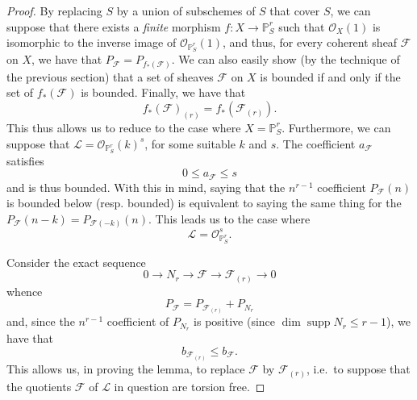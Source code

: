 \documentclass{article}
\newcommand{\oldpage}[1]{\marginpar{\footnotesize$\Big\vert$ \textit{p.~#1}}}
\theoremstyle{definition}
\theoremstyle{definition}
\theoremstyle{definition}
\theoremstyle{definition}
\theoremstyle{remark}
\begin{document}
\begin{proof}
By replacing \(S\) by a union of subschemes of \(S\) that cover \(S\), we can suppose that there exists a \emph{finite} morphism \(f\colon X\to\mathbb{P}_S^r\) such that \({\mathscr{O}}_X(1)\) is isomorphic to the inverse image of \({\mathscr{O}}_{\mathbb{P}_S^r}(1)\), and thus, for every coherent sheaf \({\mathscr{F}}\) on \(X\), we have that \(P_{\mathscr{F}}=P_{f_*({\mathscr{F}})}\).
We can also easily show (by the technique of the previous section) that a set of sheaves \({\mathscr{F}}\) on \(X\) is bounded if and only if the set of \(f_*({\mathscr{F}})\) is bounded.
Finally, we have that
\[
  f_*({\mathscr{F}})_{(r)} = f_*({\mathscr{F}}_{(r)}).
\]
\oldpage{221-08}This thus allows us to reduce to the case where \(X=\mathbb{P}_S^r\).
Furthermore, we can suppose that \({\mathscr{L}}={\mathscr{O}}_{\mathbb{P}_S^r}(k)^s\), for some suitable \(k\) and \(s\).
The coefficient \(a_{\mathscr{F}}\) satisfies
\[
  0\leqslant a_{\mathscr{F}} \leqslant s
\]
and is thus bounded.
With this in mind, saying that the \(n^{r-1}\) coefficient \(P_{\mathscr{F}}(n)\) is bounded below (resp. bounded) is equivalent to saying the same thing for the \(P_{\mathscr{F}}(n-k)=P_{{\mathscr{F}}(-k)}(n)\).
This leads us to the case where
\[
  {\mathscr{L}} = {\mathscr{O}}_{\mathbb{P}_S^r}^s.
\]

Consider the exact sequence
\[
  0 \to N_r \to {\mathscr{F}} \to {\mathscr{F}}_{(r)} \to 0
\]
whence
\[
  P_{\mathscr{F}} = P_{{\mathscr{F}}_{(r)}} + P_{N_r}
\]
and, since the \(n^{r-1}\) coefficient of \(P_{N_r}\) is positive (since \(\dim\operatorname{supp}N_r\leqslant r-1\)), we have that
\[
  b_{{\mathscr{F}}_{(r)}} \leqslant b_{\mathscr{F}}.
\]
This allows us, in proving the lemma, to replace \({\mathscr{F}}\) by \({\mathscr{F}}_{(r)}\), i.e.~to suppose that the quotients \({\mathscr{F}}\) of \({\mathscr{L}}\) in question are torsion free.


\end{proof}
\end{document}
